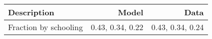 \begin{tabular}{lrr}
\hline
Description & Model  & Data  \\ 
\hline
Fraction by schooling & 0.43, 0.34, 0.22  & 0.43, 0.34, 0.24  \\ 
\hline
\end{tabular}%
